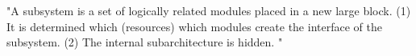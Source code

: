 "A subsystem is a set of logically related modules placed in a new large block. (1) It is determined which (resources) which modules create the interface of the subsystem. (2) The internal subarchitecture is hidden. "
